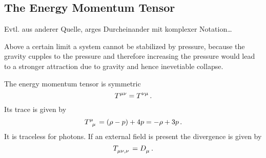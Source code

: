\subsection{The Energy Momentum Tensor}
Evtl. aus anderer Quelle, arges Durcheinander mit komplexer Notation\ldots
\begin{sidenote}
Above a certain limit a system cannot be stabilized by pressure, because the
gravity cupples to the pressure and therefore increasing the pressure would lead
to a stronger attraction due to gravity and hence inevetiable collapse.
\end{sidenote}
The energy momentum tensor is symmetric 
\begin{equation}
\tensor{T}{^\mu^\nu}=\tensor{T}{^\nu^\mu}\, .
\end{equation}
Its trace is given by
\begin{equation}
\tensor{T}{^\mu_\mu}=(\rho-p)+4p=-\rho+3p\, .
\end{equation}
It is traceless for photons. If an external field is present the divergence is
given by
\begin{equation}
\tensor{T}{_\mu_\nu_,_\nu}=\tensor{D}{_\mu}\,  .
\end{equation}
